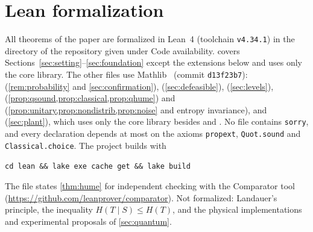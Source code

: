 \section{Lean formalization}\label{app:formalization}

All theorems of the paper are formalized in Lean~4 (toolchain \texttt{v4.34.1}) in the
directory  of the repository given under Code availability.
 covers Sections~\ref{sec:setting}--\ref{sec:foundation} except the extensions
below and uses only the core library. The other files use Mathlib~\cite{mathlib} (commit
\texttt{d13f23b7}):  (\cref{rem:probability} and
\cref{sec:confirmation}),  (\cref{sec:defeasible}), 
(\cref{sec:levels}), 
(\cref{prop:qsound,prop:classical,prop:qhume}) and 
(\cref{prop:unitary,prop:nondistrib,prop:noise} and entropy invariance), and 
(\cref{sec:plant}), which uses only the core library besides  and
. No file contains
\texttt{sorry}, and every declaration depends at most on the axioms \texttt{propext},
\texttt{Quot.sound} and \texttt{Classical.choice}. The project builds with
\begin{center}\texttt{cd lean \&\& lake exe cache get \&\& lake build}\end{center}
The file  states
\cref{thm:hume} for independent checking with the Comparator tool
(\url{https://github.com/leanprover/comparator}). Not formalized: Landauer's
principle, the inequality $H(T\mid S)\le H(T)$, and the physical implementations and experimental
proposals of \cref{sec:quantum}.

